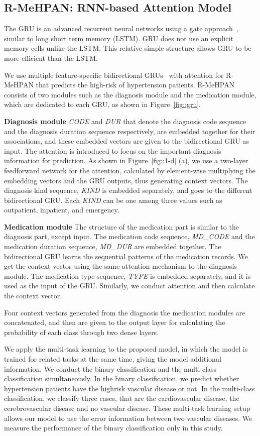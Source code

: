 \documentclass{article}
\begin{document}
\subsection{R-MeHPAN: RNN-based Attention Model}
The GRU is an advanced recurrent neural networks using a gate approach~\cite{chung2014empirical}, similar to long short term memory (LSTM). GRU does not use an explicit memory cells unlike the LSTM. This relative simple structure allows GRU to be more efficient than the LSTM. 

We use multiple feature-specific bidirectional GRUs~\cite{ha2016large} with attention for R-MeHPAN that predicts the high-risk of hypertension patients. 
R-MeHPAN consists of two modules such as the diagnosis module and the medication module, which are dedicated to each GRU, as shown in Figure~\ref{fig::gru}. 

\noindent\textbf{Diagnosis module} \textit{CODE} and \textit{DUR} that denote the diagnosis code sequence and the diagnosis duration sequence respectively, are embedded together for their associations, and these embedded vectors are given to the bidirectional GRU as input. 
The attention is introduced to focus on the important diagnosis information for prediction. As shown in Figure~\ref{fig::1-d} (a), we use a two-layer feedforward network for the attention, calculated by element-wise multiplying the embedding vectors and the GRU outputs, thus generating context vectors.
The diagnosis kind sequence, \textit{KIND} is embedded separately, and goes to the different bidirectional GRU. Each \textit{KIND} can be one among three values such as outpatient, inpatient, and emergency. 

\noindent\textbf{Medication module} The structure of the medication part is similar to the diagnosis part, except input. The medication code sequence, \textit{MD\_CODE} and the medication duration sequence, \textit{MD\_DUR} are embedded together. The bidirectional GRU learns the sequential patterns of the medication records. We get the context vector using the same attention mechanism to the diagnosis module. 
The medication type sequence, \textit{TYPE} is embedded separately, and it is used as the input of the GRU. Similarly, we conduct attention and then calculate the context vector. 

Four context vectors generated from the diagnosis the medication modules are concatenated, and then are given to the output layer for calculating the probability of each class through two dense layers.

We apply the multi-task learning to the proposed model, in which the model is trained for related tasks at the same time, giving the model additional information. We conduct the binary classification and the multi-class classification simultaneously. In the binary classification, we predict whether hypertension patients have the highrisk vascular disease or not. In the multi-class classification, we classify three cases, that are the cardiovascular disease, the cerebrovascular disease and no vascular disease. These multi-task learning setup allows our model to use the error information between two vascular diseases. We measure the performance of the binary classification only in this study.
\end{document}
